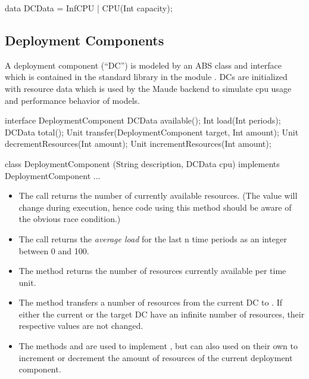 \begin{absexample} 
data DCData = InfCPU | CPU(Int capacity);
\end{absexample} 

\subsection{Deployment Components}

   A deployment component (``DC'') is modeled by an ABS class and
   interface  which is contained in the
   standard library in the module .  DCs are initialized
   with resource data which is used by the Maude backend to simulate cpu
   usage and performance behavior of models.

\begin{absexample} 
interface DeploymentComponent {
    DCData available();
    Int load(Int periods);
    DCData total();
    Unit transfer(DeploymentComponent target, Int amount);
    Unit decrementResources(Int amount);
    Unit incrementResources(Int amount);
}

class DeploymentComponent (String description, DCData cpu)
implements DeploymentComponent {
    ...
}
\end{absexample} 

\begin{itemize}
\item The call  returns the number of currently
 available resources.  (The value will change during execution,
     hence code using this method should be aware of the obvious race
     condition.)
\item The call  returns the \emph{average load} for the
     last n time periods as an integer between 0 and 100.
\item The method  returns the number of resources currently
     available per time unit.
\item The method  transfers a number of
     resources from the current DC to .  If either the
     current or the target DC have an infinite number of resources,
     their respective values are not changed.
   \item The methods  and 
     are used to implement , but can also used on their
     own to increment or decrement the amount of resources of the
     current deployment component.
\end{itemize}

